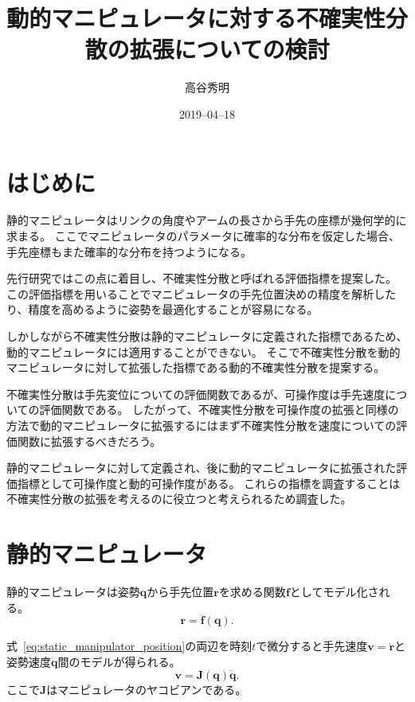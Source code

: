 \documentclass[10pt,a4j,twocolumn]{ltjsarticle}
\title{動的マニピュレータに対する不確実性分散の拡張についての検討} %
\author{高谷秀明}                              %
\date{2019--04--18}                              %
\begin{document}
\maketitle

\section{はじめに}

静的マニピュレータはリンクの角度やアームの長さから手先の座標が幾何学的に求まる。
ここでマニピュレータのパラメータに確率的な分布を仮定した場合、手先座標もまた確率的な分布を持つようになる。

先行研究ではこの点に着目し、不確実性分散と呼ばれる評価指標を提案した。
この評価指標を用いることでマニピュレータの手先位置決めの精度を解析したり、精度を高めるように姿勢を最適化することが容易になる。

しかしながら不確実性分散は静的マニピュレータに定義された指標であるため、動的マニピュレータには適用することができない。
そこで不確実性分散を動的マニピュレータに対して拡張した指標である動的不確実性分散を提案する。

不確実性分散は手先変位についての評価関数であるが、可操作度は手先速度についての評価関数である。
したがって、不確実性分散を可操作度の拡張と同様の方法で動的マニピュレータに拡張するにはまず不確実性分散を速度についての評価関数に拡張するべきだろう。

静的マニピュレータに対して定義され、後に動的マニピュレータに拡張された評価指標として可操作度と動的可操作度がある。
これらの指標を調査することは不確実性分散の拡張を考えるのに役立つと考えられるため調査した。

\section{静的マニピュレータ}

静的マニピュレータは姿勢$\bm{q}$から手先位置$\bm{r}$を求める関数$\bm{f}$としてモデル化される。
\begin{equation}
  \bm{r} = \bm{f}(\bm{q}). \label{eq:static_manipulator_position}
\end{equation}

式~\eqref{eq:static_manipulator_position}の両辺を時刻$t$で微分すると手先速度$\bm{v} = \dot{\bm{r}}$と姿勢速度$\dot{\bm{q}}$間のモデルが得られる。
\begin{equation}
  \bm{v} = \bm{J}(\bm{q}) \dot{\bm{q}}. \label{eq:static_manipulator_velocity}
\end{equation}
ここで$\bm{J}$はマニピュレータのヤコビアンである。
\end{document}
